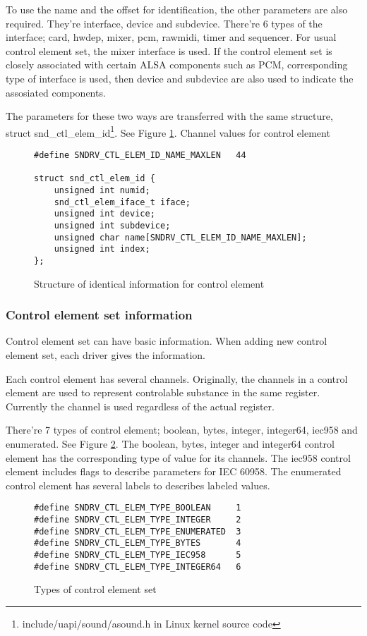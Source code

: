 \documentclass[onecolumn]{article}
\begin{document}
To use the name and the offset for identification, the other parameters are also required. They're interface, device and subdevice. There're 6 types of the interface; card, hwdep, mixer, pcm, rawmidi, timer and sequencer. For usual control element set, the mixer interface is used. If the control element set is closely associated with certain ALSA components such as PCM, corresponding type of interface is used, then device and subdevice are also used to indicate the assosiated components\cite{alsa-driver}.

The parameters for these two ways are transferred with the same structure, struct snd\_ctl\_elem\_id\footnote{include/uapi/sound/asound.h in Linux kernel source code}. See Figure \ref{fig:control-element-id}.
Channel values for control element
\begin{figure}[htbp]
\small
\begin{verbatim}
#define SNDRV_CTL_ELEM_ID_NAME_MAXLEN	44

struct snd_ctl_elem_id {
    unsigned int numid;
    snd_ctl_elem_iface_t iface;
    unsigned int device;
    unsigned int subdevice;
    unsigned char name[SNDRV_CTL_ELEM_ID_NAME_MAXLEN];
    unsigned int index;
};
\end{verbatim}
\caption{{Structure of identical information for control element}}
\label{fig:control-element-id}
\end{figure}


\subsubsection{Control element set information}

Control element set can have basic information. When adding new control element set, each driver gives the information.

Each control element has several channels. Originally, the channels in a control element are used to represent controlable substance in the same register. Currently the channel is used regardless of the actual register.

There're 7 types of control element; boolean, bytes, integer, integer64, iec958 and enumerated. See Figure \ref{fig:element-set-types}. The boolean, bytes, integer and integer64 control element has the corresponding type of value for its channels. The iec958 control element includes flags to describe parameters for IEC 60958. The enumerated control element has several labels to describes labeled values.

\begin{figure}[htbp]
\small
\begin{verbatim}
#define SNDRV_CTL_ELEM_TYPE_BOOLEAN     1
#define SNDRV_CTL_ELEM_TYPE_INTEGER     2
#define SNDRV_CTL_ELEM_TYPE_ENUMERATED  3
#define SNDRV_CTL_ELEM_TYPE_BYTES       4
#define SNDRV_CTL_ELEM_TYPE_IEC958      5
#define SNDRV_CTL_ELEM_TYPE_INTEGER64   6
\end{verbatim}
\caption{{Types of control element set}}
\label{fig:element-set-types}
\end{figure}
\end{document}
